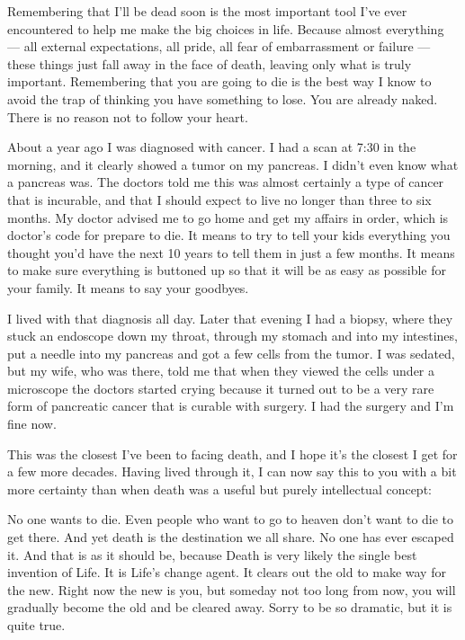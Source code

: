 \documentclass{ltjsarticle}
\begin{document}
Remembering that I’ll be dead soon is the most important tool I’ve ever encountered to help me make the big choices in life. Because almost everything — all external expectations, all pride, all fear of embarrassment or failure — these things just fall away in the face of death, leaving only what is truly important. Remembering that you are going to die is the best way I know to avoid the trap of thinking you have something to lose. You are already naked. There is no reason not to follow your heart.

About a year ago I was diagnosed with cancer. I had a scan at 7:30 in the morning, and it clearly showed a tumor on my pancreas. I didn’t even know what a pancreas was. The doctors told me this was almost certainly a type of cancer that is incurable, and that I should expect to live no longer than three to six months. My doctor advised me to go home and get my affairs in order, which is doctor’s code for prepare to die. It means to try to tell your kids everything you thought you’d have the next 10 years to tell them in just a few months. It means to make sure everything is buttoned up so that it will be as easy as possible for your family. It means to say your goodbyes.

I lived with that diagnosis all day. Later that evening I had a biopsy, where they stuck an endoscope down my throat, through my stomach and into my intestines, put a needle into my pancreas and got a few cells from the tumor. I was sedated, but my wife, who was there, told me that when they viewed the cells under a microscope the doctors started crying because it turned out to be a very rare form of pancreatic cancer that is curable with surgery. I had the surgery and I’m fine now.

This was the closest I’ve been to facing death, and I hope it’s the closest I get for a few more decades. Having lived through it, I can now say this to you with a bit more certainty than when death was a useful but purely intellectual concept:

No one wants to die. Even people who want to go to heaven don’t want to die to get there. And yet death is the destination we all share. No one has ever escaped it. And that is as it should be, because Death is very likely the single best invention of Life. It is Life’s change agent. It clears out the old to make way for the new. Right now the new is you, but someday not too long from now, you will gradually become the old and be cleared away. Sorry to be so dramatic, but it is quite true.
\end{document}
